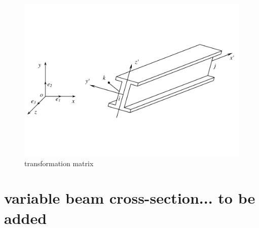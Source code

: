 \begin{figure}[h!]
\centering
\includegraphics[width=0.5\linewidth]{figures/transformation_for_beam}
\caption{transformation matrix}
\label{fig:transformationforbeam}
\end{figure}

\section{variable beam cross-section... to be added}